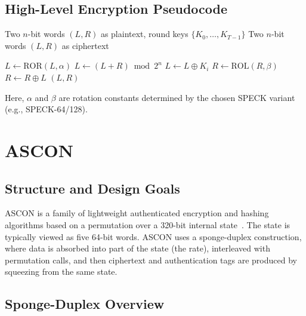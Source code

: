 \documentclass[12pt]{report}
\begin{document}
\subsection*{High-Level Encryption Pseudocode}

\begin{algorithm}[H]
    \caption{SPECK Encryption (High-Level)}
    \label{alg:speck-encrypt}
    \begin{algorithmic}[1]
        \REQUIRE Two $n$-bit words $(L, R)$ as plaintext, round keys $\{K_0, \dots, K_{T-1}\}$
        \ENSURE Two $n$-bit words $(L, R)$ as ciphertext

        \STATE $L \gets \textrm{ROR}(L, \alpha)$
        \STATE $L \gets (L + R) \bmod 2^n$
        \STATE $L \gets L \oplus K_i$
        \STATE $R \gets \textrm{ROL}(R, \beta)$
        \STATE $R \gets R \oplus L$
        \ENDFOR
        \RETURN $(L, R)$
    \end{algorithmic}
\end{algorithm}

Here, $\alpha$ and $\beta$ are rotation constants determined by the chosen SPECK variant (e.g., SPECK-64/128).

\section{ASCON}

\subsection*{Structure and Design Goals}

ASCON is a family of lightweight authenticated encryption and hashing algorithms based on
a permutation over a 320-bit internal state~\cite{dobraunig2016ascon,nist2023lwc}. The
state is typically viewed as five 64-bit words. ASCON uses a sponge-duplex construction,
where data is absorbed into part of the state (the rate), interleaved with permutation
calls, and then ciphertext and authentication tags are produced by squeezing from the same state.

\subsection*{Sponge-Duplex Overview}
\end{document}
